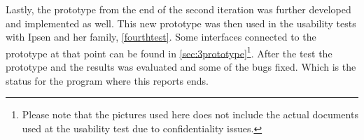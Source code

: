 Lastly,  the prototype from the end of the second iteration was further developed and implemented as well.
This new prototype was then used in the usability tests with Ipsen and her family, \cref{fourthtest}.
Some interfaces connected to the prototype at that point can be found in \cref{sec:3prototype}\footnote{Please note that the pictures used here does not include the actual documents used at the usability test due to confidentiality issues.}.
After the test the prototype and the results was evaluated and some of the bugs fixed.
Which is the status for the program where this reports ends.
